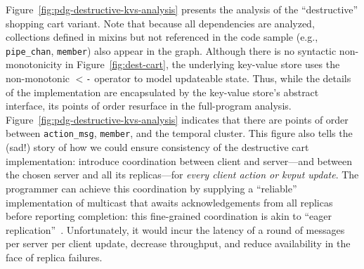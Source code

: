 Figure~\ref{fig:pdg-destructive-kvs-analysis} presents the analysis of the 
``destructive'' shopping cart variant.  Note that
because all dependencies are analyzed, collections defined in mixins
but not referenced in the code sample
(e.g., \texttt{pipe\_chan}, \texttt{member}) also appear in the graph.
Although there is no syntactic
non-monotonicity in 
Figure~\ref{fig:dest-cart}, the underlying key-value store
uses the non-monotonic \texttt{$<$-} operator to model updateable state.
Thus, while the details of the implementation are encapsulated by the key-value
store's abstract interface, its points of order resurface in the full-program analysis.
Figure~\ref{fig:pdg-destructive-kvs-analysis}
indicates that there are
points of order between \texttt{action\_msg}, \texttt{member}, and the temporal cluster.
This figure also tells the (sad!) story of how we could ensure consistency of
the destructive cart implementation: introduce coordination between client and
server---and between the chosen server and all its replicas---for {\em every
  client action or kvput update}.  The programmer can achieve this
coordination by supplying a ``reliable'' implementation of multicast that awaits
acknowledgements from all replicas before reporting completion: this
fine-grained coordination is akin to ``eager replication''~\cite{dangers}.
Unfortunately, it would incur the latency of a round of messages per server per
client update, decrease throughput, and reduce availability in the face of
replica failures.

